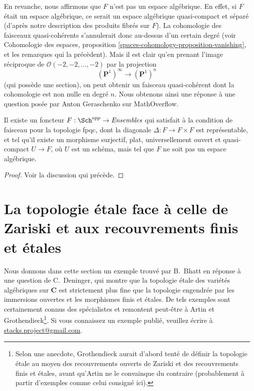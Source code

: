 \medskip\noindent
En revanche, nous affirmons que $F$ n'est pas un espace algébrique.
En effet, si $F$ était un espace algébrique, ce serait un espace algébrique
quasi-compact et séparé (d'après notre description des produits fibrés sur $F$).
La cohomologie des faisceaux quasi-cohérents s'annulerait donc au-dessus d'un
certain degré (voir
Cohomologie des espaces, proposition \ref{spaces-cohomology-proposition-vanishing},
et les remarques qui la précèdent). Mais il est clair qu'en prenant l'image réciproque
de $\mathcal{O}(-2, -2, \ldots, -2)$ par la projection
$$
(\mathbf{P}^1)^\infty \longrightarrow (\mathbf{P}^1)^n
$$
(qui possède une section), on peut obtenir un faisceau quasi-cohérent dont la cohomologie
est non nulle en degré $n$. Nous obtenons ainsi une réponse à une question posée
par Anton Geraschenko sur MathOverflow.

\begin{lemma}
\label{lemma-not-algebraic}
Il existe un foncteur $F : \Sch^{opp} \to \textit{Ensembles}$
qui satisfait à la condition de faisceau pour la topologie fpqc, dont la diagonale
$\Delta : F \to F \times F$ est représentable, et tel qu'il existe un morphisme
surjectif, plat, universellement ouvert et quasi-compact
$U \to F$, où $U$ est un schéma, mais tel que $F$ ne soit pas un espace algébrique.
\end{lemma}

\begin{proof}
Voir la discussion qui précède.
\end{proof}







\section[Topologie \'etale, Zariski et recouvrements finis \'etales]{La topologie \'etale face à celle de Zariski et aux recouvrements finis et \'etales}
\label{section-etale-zariski-finite-etale}

\noindent
Nous donnons dans cette section un exemple trouvé par B.~Bhatt en réponse
à une question de C.~Deninger, qui montre que la topologie \'etale
des variétés algébriques sur $\mathbf{C}$ est strictement plus fine que la
topologie engendrée par les immersions ouvertes et les morphismes finis et \'etales.
De tels exemples sont certainement connus des spécialistes et remontent peut-être
à Artin et Grothendieck\footnote{Selon une anecdote, Grothendieck aurait d'abord
tenté de définir la topologie \'etale au moyen des recouvrements ouverts de Zariski et des
recouvrements finis et \'etales, avant qu'Artin ne le convainque du contraire
(probablement à partir d'exemples comme celui consigné ici).}.
Si vous connaissez un exemple publié, veuillez écrire à
\href{mailto:stacks.project@gmail.com}{stacks.project@gmail.com}.

